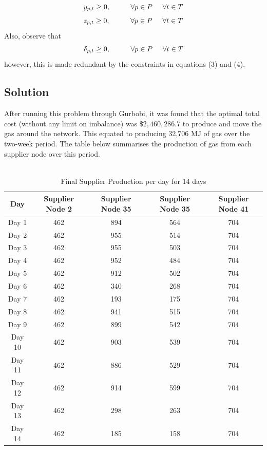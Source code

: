 \documentclass{article}
\begin{document}
\[y_{p,t} \geq 0, \hspace{1cm} \forall p \in P \hspace{0.5cm} \forall t \in T\]
\[z_{p,t} \geq 0, \hspace{1cm} \forall p \in P \hspace{0.5cm} \forall t \in T\]
Also, observe that
\[\delta_{p,t} \geq 0, \hspace{1cm} \forall p \in P \hspace{0.5cm} \forall t \in T\]
however, this is made redundant by the constraints in equations (3) and (4).
\bigskip


\bigskip
\subsection{Solution}
\bigskip

After running this problem through Gurbobi, it was found that the optimal total cost (without any limit on imbalance) was \(\$2,460,286.7\) to produce and move the gas around the network. This equated to producing 32,706 MJ of gas over the two-week period. The table below summarises the production of gas from each supplier node over this period.\\
\\
\renewcommand\baselinestretch{1.5}
\begin{table}[h]
    \centering
    \color{black}
    \begin{tabular}{|c:c:c:c:c|}
        \hline
        \textbf{Day} & \textbf{Supplier Node 2} & \textbf{Supplier Node 35} & \textbf{Supplier Node 35} & \textbf{Supplier Node 41} \\
        \hline
        Day 1 & 462 & 894 & 564 & 704 \\ \hdashline
        Day 2 & 462 & 955 & 514 & 704 \\ \hdashline
        Day 3 & 462 & 955 & 503 & 704 \\ \hdashline
        Day 4 & 462 & 952 & 484 & 704 \\ \hdashline
        Day 5 & 462 & 912 & 502 & 704 \\ \hdashline
        Day 6 & 462 & 340 & 268 & 704 \\ \hdashline
        Day 7 & 462 & 193 & 175 & 704 \\ \hdashline
        Day 8 & 462 & 941 & 515 & 704 \\ \hdashline
        Day 9 & 462 & 899 & 542 & 704 \\ \hdashline
        Day 10 & 462 & 903 & 539 & 704 \\ \hdashline
        Day 11 & 462 & 886 & 529 & 704 \\ \hdashline
        Day 12 & 462 & 914 & 599 & 704 \\ \hdashline
        Day 13 & 462 & 298 & 263 & 704 \\ \hdashline
        Day 14 & 462 & 185 & 158 & 704 \\ \hline
    \end{tabular}
    \caption{Final Supplier Production per day for 14 days}
    \label{tab:gasgena}
\end{table}
\renewcommand\baselinestretch{1}
\newpage
\end{document}
